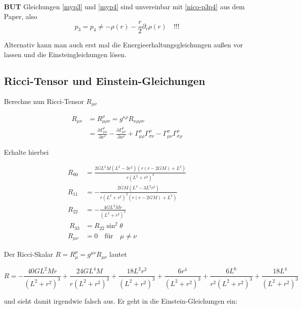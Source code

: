 \documentclass[12pt,a4paper]{article}
\begin{document}
{\bf BUT} Gleichungen \ref{myp3} und \ref{myp4} sind unvereinbar mit \ref{nico-p3p4} aus dem Paper, also
\begin{equation}
p_3=p_4 \neq -\rho(r) - \frac{r}{2} \partial_r \rho(r) \quad !!!
\end{equation}

Alternativ kann man auch erst mal die Energieerhaltungsgleichungen außen vor lassen und die Einsteingleichungen lösen.

\subsection{Ricci-Tensor und Einstein-Gleichungen}
Berechne nun Ricci-Tensor $R_{\mu\nu}$

\begin{align}
R_{\mu \nu} &= R^\rho_{\mu \rho \nu} = g^{\kappa \rho} R_{\kappa \mu \rho \nu} \\
 &= \frac{\partial \Gamma^\rho_{\mu\rho}}{\partial x^\nu} - \frac{\partial \Gamma^\rho_{\mu\nu}}{\partial x^\rho	} + \Gamma^\sigma_{\mu\rho} \Gamma^\rho_{\sigma \nu} - \Gamma^\sigma_{\mu\nu}\Gamma^\rho_{\sigma\rho}
\end{align}

Erhalte hierbei

\begin{align}
R_{00} &= \frac{2 G L^2 M \left(L^2-3 r^2\right) \left(r (r-2 G M)+L^2\right)}{r
   \left(L^2+r^2\right)^4} \\
R_{11} &= -\frac{2 G M \left(L^4-3 L^2 r^2\right)}{r \left(L^2+r^2\right)^2 \left(r
   (r-2 G M)+L^2\right)} \\
R_{22} &= -\frac{4 G L^2 M r}{\left(L^2+r^2\right)^2} \\\
R_{33} &= R_{22} \sin^2 \theta \\
R_{\mu \nu} &= 0 \quad\text{für}\quad \mu \neq \nu 
\end{align}

Der Ricci-Skalar $R = R^\mu_\mu = g^{\mu \nu} R_{\mu \nu}$ lautet

\begin{equation}
R = -\frac{40 G L^2 M r}{\left(L^2+r^2\right)^3}+\frac{24 G L^4 M}{r \left(L^2+r^2\right)^3}+\frac{18 L^2
   r^2}{\left(L^2+r^2\right)^3}+\frac{6 r^4}{\left(L^2+r^2\right)^3}+\frac{6 L^6}{r^2
   \left(L^2+r^2\right)^3}+\frac{18 L^4}{\left(L^2+r^2\right)^3}
\end{equation}

und sieht damit irgendwie falsch aus. Er geht in die Einstein-Gleichungen ein:
\end{document}
